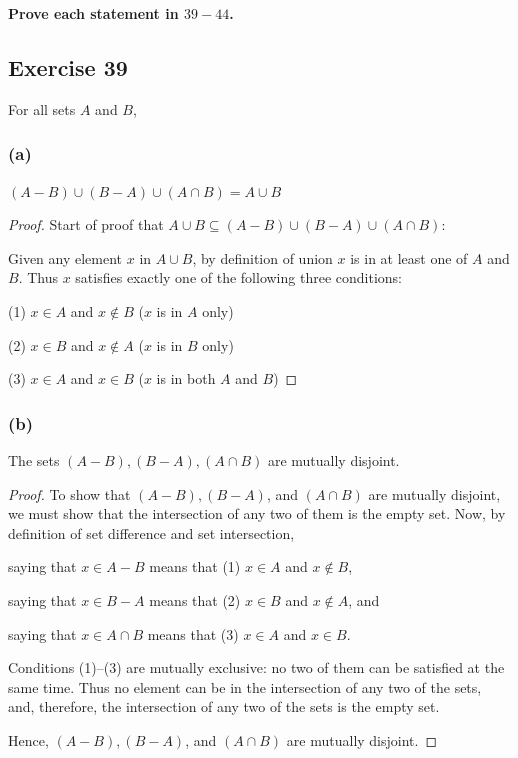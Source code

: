 \documentclass[14pt]{extarticle}
\newcommand{\cy}{\color{cyan}}
\begin{document}
{\bf \cy Prove each statement in $39-44$.}

\subsection{Exercise 39}
For all sets $A$ and $B$,

\subsubsection{(a)}
\((A - B) \cup (B - A) \cup (A \cap B) = A \cup B\)

\begin{proof}
Start of proof that \(A \cup B \subseteq (A-B) \cup (B-A) \cup (A \cap B)\): 

Given any element $x$ in \(A \cup B\), by definition of union $x$ is in at least one of $A$ and $B$. Thus $x$ 
satisfies exactly one of the following three conditions: 

(1) \(x \in A\) and \(x \notin B\) ($x$ is in $A$ only) 

(2) \(x \in B\) and \(x \notin A\) ($x$ is in $B$ only) 

(3) \(x \in A\) and \(x \in B\) ($x$ is in both $A$ and $B$)
\end{proof}

\subsubsection{(b)}
The sets \((A - B), (B - A), (A \cap B)\) are mutually disjoint.

\begin{proof}
To show that \((A - B), (B - A)\), and \((A \cap B)\) are mutually disjoint, we must show that the intersection of 
any two of them is the empty set. Now, by definition of set difference and set intersection, 

saying that \(x \in A - B\) means that (1) \(x \in A\) and \(x \notin B\), 

saying that \(x \in B - A\) means that (2) \(x \in B\) and \(x \notin A\), and 

saying that \(x \in A \cap B\) means that (3) \(x \in A\) and \(x \in B\). 

Conditions (1)–(3) are mutually exclusive: no two of them can be satisfied at the same time. Thus no element can be 
in the intersection of any two of the sets, and, therefore, the intersection of any two of the sets is the empty set. 

Hence, \((A - B), (B - A)\), and \((A \cap B)\) are mutually disjoint.
\end{proof}
\end{document}
